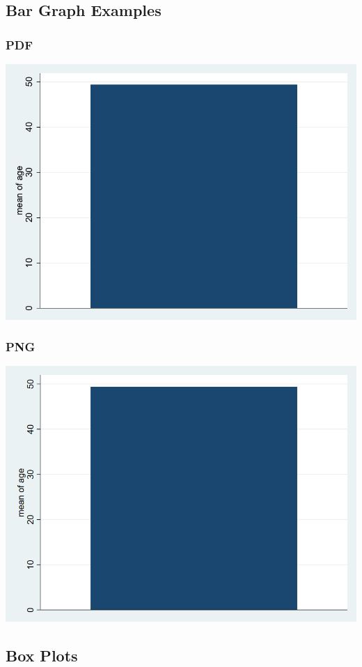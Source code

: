 \documentclass{beamer}
\begin{document}
\subsection{Bar Graph Examples}

\begin{frame}
	\frametitle{PDF}
		\includegraphics[scale=0.7]{DVgraph01.pdf}
\end{frame}

\begin{frame}
	\frametitle{PNG}
		\includegraphics[scale=0.3]{DVgraph01.png}
\end{frame}

\subsection{Box Plots}
\end{document}
